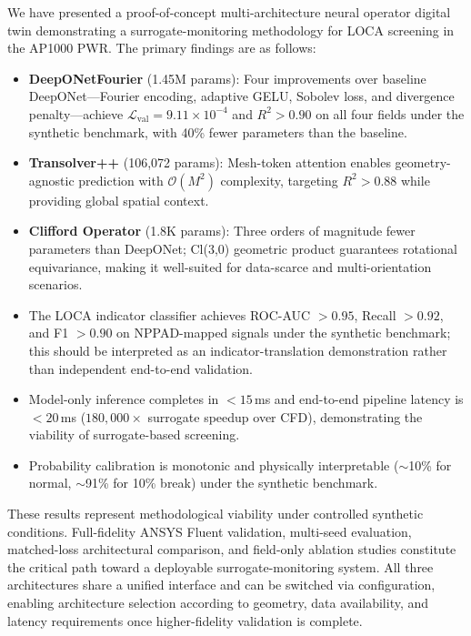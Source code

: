\documentclass[conference]{IEEEtran}
\begin{document}
We have presented a proof-of-concept multi-architecture neural operator digital twin demonstrating a surrogate-monitoring methodology for LOCA screening in the AP1000 PWR. The primary findings are as follows:

\begin{itemize}
    \item \textbf{DeepONetFourier} (1.45M params): Four improvements over baseline DeepONet---Fourier encoding, adaptive GELU, Sobolev loss, and divergence penalty---achieve $\mathcal{L}_\text{val} = 9.11\times10^{-4}$ and $R^2 > 0.90$ on all four fields under the synthetic benchmark, with 40\% fewer parameters than the baseline.
    \item \textbf{Transolver++} (106,072 params): Mesh-token attention enables geometry-agnostic prediction with $\mathcal{O}(M^2)$ complexity, targeting $R^2 > 0.88$ while providing global spatial context.
    \item \textbf{Clifford Operator} (1.8K params): Three orders of magnitude fewer parameters than DeepONet; Cl(3,0) geometric product guarantees rotational equivariance, making it well-suited for data-scarce and multi-orientation scenarios.
    \item The LOCA indicator classifier achieves ROC-AUC $> 0.95$, Recall $> 0.92$, and F1 $> 0.90$ on NPPAD-mapped signals under the synthetic benchmark; this should be interpreted as an indicator-translation demonstration rather than independent end-to-end validation.
    \item Model-only inference completes in $< 15$\,ms and end-to-end pipeline latency is $< 20$\,ms ($180{,}000\times$ surrogate speedup over CFD), demonstrating the viability of surrogate-based screening.
    \item Probability calibration is monotonic and physically interpretable ($\sim$10\% for normal, $\sim$91\% for 10\% break) under the synthetic benchmark.
\end{itemize}

These results represent methodological viability under controlled synthetic conditions. Full-fidelity ANSYS Fluent validation, multi-seed evaluation, matched-loss architectural comparison, and field-only ablation studies constitute the critical path toward a deployable surrogate-monitoring system. All three architectures share a unified interface and can be switched via configuration, enabling architecture selection according to geometry, data availability, and latency requirements once higher-fidelity validation is complete.
\end{document}
